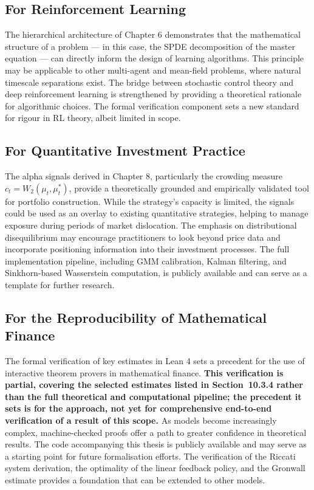 \subsection{For Reinforcement Learning}

The hierarchical architecture of Chapter 6 demonstrates that the mathematical
structure of a problem --- in this case, the SPDE decomposition of the master
equation --- can directly inform the design of learning algorithms. This
principle may be applicable to other multi-agent and mean-field problems, where
natural timescale separations exist. The bridge between stochastic control theory
and deep reinforcement learning is strengthened by providing a theoretical
rationale for algorithmic choices. The formal verification component sets a new
standard for rigour in RL theory, albeit limited in scope.

\subsection{For Quantitative Investment Practice}

The alpha signals derived in Chapter 8, particularly the crowding measure
$c_t = W_2(\mu_t, \mu_t^*)$, provide a theoretically grounded and empirically
validated tool for portfolio construction. While the strategy's capacity is
limited, the signals could be used as an overlay to existing quantitative
strategies, helping to manage exposure during periods of market dislocation. The
emphasis on distributional disequilibrium may encourage practitioners to look
beyond price data and incorporate positioning information into their investment
processes. The full implementation pipeline, including GMM calibration, Kalman
filtering, and Sinkhorn-based Wasserstein computation, is publicly available and
can serve as a template for further research.

\subsection{For the Reproducibility of Mathematical Finance}

The formal verification of key estimates in Lean 4 sets a precedent for the use
of interactive theorem provers in mathematical finance. \textbf{This verification
is partial, covering the selected estimates listed in Section~10.3.4 rather than
the full theoretical and computational pipeline; the precedent it sets is for the
approach, not yet for comprehensive end-to-end verification of a result of this
scope.} As models become
increasingly complex, machine-checked proofs offer a path to greater confidence
in theoretical results. The code accompanying this thesis is publicly available
and may serve as a starting point for future formalisation efforts. The
verification of the Riccati system derivation, the optimality of the linear
feedback policy, and the Gronwall estimate provides a foundation that can be
extended to other models.


